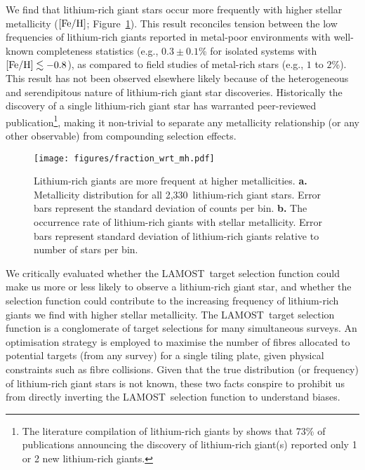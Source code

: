 \documentclass[twocolumn]{aastex62}
\newcommand{\SampleSize}{2,330}
\newcommand\lamost{LAMOST}
\begin{document}
We find that lithium-rich giant stars occur more frequently with higher stellar 
metallicity ($[{\rm Fe/H}]$; Figure~\ref{fig:mdf_frequency}). This result 
reconciles tension between the low frequencies of lithium-rich giants reported 
in metal-poor environments with well-known completeness statistics \citep{Kirby_2016} 
(e.g., $0.3 \pm 0.1$\% for isolated systems with $[{\rm Fe/H}] \lesssim -0.8$), 
as compared to field studies of metal-rich stars \citep{Brown_1989} (e.g., $1$ to $2$\%). 
This result has not been observed elsewhere likely because of the heterogeneous and 
serendipitous nature of lithium-rich giant star discoveries. Historically the 
discovery of a single lithium-rich giant star has warranted peer-reviewed 
publication\footnote{The literature compilation of lithium-rich giants by \citet{Casey_2016} shows that 73\% of publications announcing the discovery of lithium-rich giant(s) reported only 1 or 2 new lithium-rich giants.}, making it non-trivial to separate any metallicity 
relationship (or any other observable) from compounding selection effects.

\begin{figure}
	\centering
	\texttt{[image: figures/fraction\_wrt\_mh.pdf]}
	\caption{
		Lithium-rich giants are more frequent at higher metallicities.
		\textbf{a.} Metallicity distribution for all
		\SampleSize\ lithium-rich giant stars. Error bars represent the standard deviation of counts per bin.
		\textbf{b.} The occurrence 
		rate of lithium-rich giants with stellar metallicity. Error bars represent standard deviation of lithium-rich giants relative to number of stars per bin.}
	\label{fig:mdf_frequency}
\end{figure} 


We critically evaluated whether the \lamost\ target selection function could 
make us more or less likely to observe a lithium-rich giant star, and whether
the selection function could contribute to the increasing frequency of lithium-rich
giants we find with higher stellar metallicity. The \lamost\ target selection function
is a conglomerate of target selections for many simultaneous surveys. An
optimisation strategy is employed to maximise the number of fibres allocated
to potential targets (from any survey) for a single tiling plate, given physical
constraints such as fibre collisions. Given that the true distribution (or 
frequency) of lithium-rich giant stars is not known, these two facts conspire 
to prohibit us from directly inverting the \lamost\ selection function to 
understand biases. 
\end{document}
